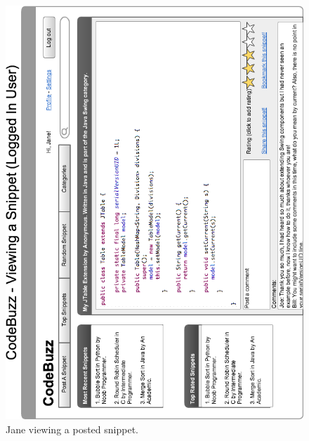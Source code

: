 \documentclass{sig-alt-release2}
\begin{document}
\begin{figure}
\includegraphics[width=\textwidth]{../imgs/LoggedInViewSnippetHorz.png}
\caption{Jane viewing a posted snippet.}
\label{fig:LoggedInViewJane}
\end{figure}
\end{document}
